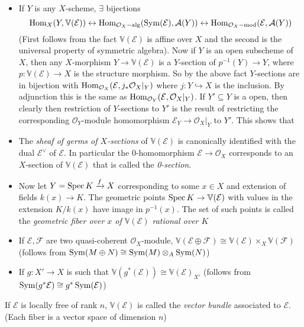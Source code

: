 \documentclass[main]{subfiles}
\begin{document}
\begin{itemize}
\item If $Y$ is any $X$-scheme, $\exists$ bijections
\[
\operatorname{Hom}_X(Y,\mathbb V(\mathcal E))\leftrightarrow\operatorname{Hom}_{\mathcal O_X-\text{alg}}(\operatorname{Sym}(\mathcal E),\mathcal A(Y))\leftrightarrow\operatorname{Hom}_{\mathcal O_X-\text{mod}}(\mathcal E,\mathcal A(Y))
\]
(First follows from the fact $\mathbb V(\mathcal E)$ is affine over $X$ and the second is the universal property of symmetric algebra). Now if $Y$ is an open subscheme of $X$, then any $X$-morphism $Y\to\mathbb V(\mathcal E)$ is a $Y$-section of $p^{-1}(Y)\to Y$, where $p:\mathbb V(\mathcal E)\to X$ is the structure morphism. So by the above fact $Y$-sections are in bijection with $\operatorname{Hom}_{\mathcal O_X}(\mathcal E,j_*\mathcal O_X|_Y)$ where $j:Y\hookrightarrow X$ is the inclusion. By adjunction this is the same as $\operatorname{Hom}_{\mathcal O_Y}(\mathcal E,\mathcal O_X|_Y)$. If $Y'\subseteq Y$ is a open, then clearly then restriction of $Y$-sections to $Y'$ is the result of restricting the corresponding $\mathcal O_Y$-module homomorphism $\mathcal E_Y\to\mathcal O_X|_Y$ to $Y'$. This shows that
\item The \textit{sheaf of germs of $X$-sections} of $\mathbb V(\mathcal E)$ is canonically identified with the dual $\mathcal E^\vee$ of $\mathcal E$. In particular the $0$-homomorphism $\mathcal E\to\mathcal O_X$ corresponds to an $X$-section of $\mathbb V(\mathcal E)$ that is called the \textit{0-section}.
\item Now let $Y=\operatorname{Spec} K\xrightarrow{f}X$ corresponding to some $x\in X$ and extension of fields $k(x)\to K$. The geometric points $\operatorname{Spec} K\to\mathbb V(\mathcal E)$ with values in the extension $K/k(x)$ have image in $p^{-1}(x)$. The set of such points is called the \textit{geometric fiber over $x$ of $\mathbb V(\mathcal E)$ rational over $K$}
\item If $\mathcal E,\mathcal F$ are two quasi-coherent $\mathcal O_X$-module, $\mathbb V(\mathcal E\oplus\mathcal F)\cong\mathbb V(\mathcal E)\times_X\mathbb V(\mathcal F)$ (follows from $\operatorname{Sym}(M\oplus N)\cong\operatorname{Sym}(M)\otimes_A\operatorname{Sym}(N)$)
\item If $g:X'\to X$ is such that $\mathbb V(g^*(\mathcal E))\cong\mathbb V(\mathcal E)_{X'}$ (follows from $\operatorname{Sym}(g^*\mathcal E)\cong g^*\operatorname{Sym}(\mathcal E)$)
\end{itemize}

\begin{definition}
If $\mathcal E$ is locally free of rank $n$, $\mathbb V(\mathcal E)$ is called the \textit{vector bundle} associated to $\mathcal E$. (Each fiber is a vector space of dimension $n$)
\end{definition}
\end{document}
